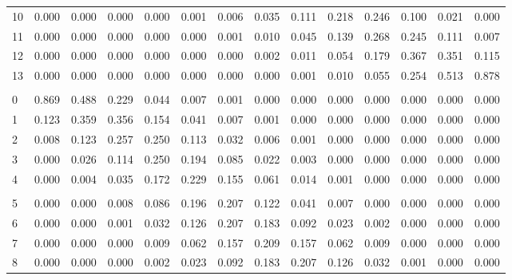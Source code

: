 \documentclass[
]{article}
\begin{document}
\begin{longtable}[t]{lrrrrrrrrrrrrr}
\hspace{1em}10 & 0.000 & 0.000 & 0.000 & 0.000 & 0.001 & 0.006 & 0.035 & 0.111 & 0.218 & 0.246 & 0.100 & 0.021 & 0.000\\
\hspace{1em}11 & 0.000 & 0.000 & 0.000 & 0.000 & 0.000 & 0.001 & 0.010 & 0.045 & 0.139 & 0.268 & 0.245 & 0.111 & 0.007\\
\hspace{1em}12 & 0.000 & 0.000 & 0.000 & 0.000 & 0.000 & 0.000 & 0.002 & 0.011 & 0.054 & 0.179 & 0.367 & 0.351 & 0.115\\
\hspace{1em}13 & 0.000 & 0.000 & 0.000 & 0.000 & 0.000 & 0.000 & 0.000 & 0.001 & 0.010 & 0.055 & 0.254 & 0.513 & 0.878\\
\addlinespace[0.3em]
\multicolumn{14}{l}{$n=14$}\\
\hspace{1em}0 & 0.869 & 0.488 & 0.229 & 0.044 & 0.007 & 0.001 & 0.000 & 0.000 & 0.000 & 0.000 & 0.000 & 0.000 & 0.000\\
\hspace{1em}1 & 0.123 & 0.359 & 0.356 & 0.154 & 0.041 & 0.007 & 0.001 & 0.000 & 0.000 & 0.000 & 0.000 & 0.000 & 0.000\\
\hspace{1em}2 & 0.008 & 0.123 & 0.257 & 0.250 & 0.113 & 0.032 & 0.006 & 0.001 & 0.000 & 0.000 & 0.000 & 0.000 & 0.000\\
\hspace{1em}3 & 0.000 & 0.026 & 0.114 & 0.250 & 0.194 & 0.085 & 0.022 & 0.003 & 0.000 & 0.000 & 0.000 & 0.000 & 0.000\\
\hspace{1em}4 & 0.000 & 0.004 & 0.035 & 0.172 & 0.229 & 0.155 & 0.061 & 0.014 & 0.001 & 0.000 & 0.000 & 0.000 & 0.000\\
\addlinespace[-.7em]
\multicolumn{14}{l}{ }\\
\hspace{1em}5 & 0.000 & 0.000 & 0.008 & 0.086 & 0.196 & 0.207 & 0.122 & 0.041 & 0.007 & 0.000 & 0.000 & 0.000 & 0.000\\
\hspace{1em}6 & 0.000 & 0.000 & 0.001 & 0.032 & 0.126 & 0.207 & 0.183 & 0.092 & 0.023 & 0.002 & 0.000 & 0.000 & 0.000\\
\hspace{1em}7 & 0.000 & 0.000 & 0.000 & 0.009 & 0.062 & 0.157 & 0.209 & 0.157 & 0.062 & 0.009 & 0.000 & 0.000 & 0.000\\
\hspace{1em}8 & 0.000 & 0.000 & 0.000 & 0.002 & 0.023 & 0.092 & 0.183 & 0.207 & 0.126 & 0.032 & 0.001 & 0.000 & 0.000\\

\end{longtable}
\end{document}
